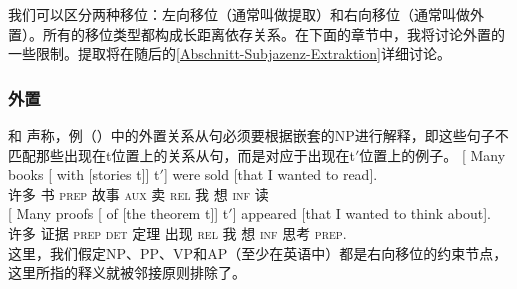 我们可以区分两种移位：左向移位（通常叫做提取）和右向移位（通常叫做外置）。所有的移位类型都构成长距离依存关系。在下面的章节中，我将讨论外置的一些限制。提取将在随后的\ref{Abschnitt-Subjazenz-Extraktion}详细讨论。

\subsubsection{外置}

\mbox{} \citet{Baltin81a}和 \citet[]{Chomsky86b}声称，例（）中的外置关系从句必须要根据嵌套的NP进行解释，即这些句子不匹配那些出现在t位置上的关系从句，而是对应于出现在t$'$位置上的例子。
\eal
\label{ex-chomsky-sub}
\ex 
\gll {}[ Many books [ with         [stories      t]] t$'$]  were         sold [that I wanted to read].\\
     {}          许多 书     {}       \textsc{prep} \spacebr{}故事 {}  {}     \textsc{aux} 卖   \spacebr\textsc{rel} 我 想 \textsc{inf} 读\\
\ex
\gll {}[ Many proofs [ of            [the theorem t]] t$'$] appeared [that I wanted to think about].\\
     {}          许多  证据    {}       \textsc{prep} \spacebr\textsc{det} 定理 {} {} 出现 \spacebr\textsc{rel} 我 想 \textsc{inf} 思考 \textsc{prep}.\\
\zl
这里，我们假定NP、PP、VP和AP（至少在英语中）都是右向移位的约束节点，这里所指的释义就被邻接原则排除了\citep[]{Baltin81a}。

